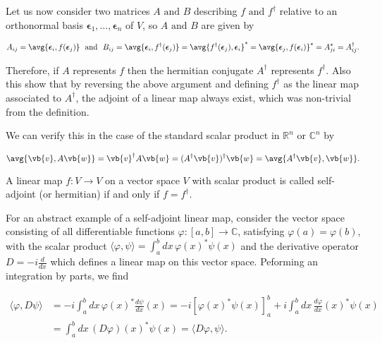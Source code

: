 \documentclass[a4paper,12pt]{report}
\begin{document}
Let us now consider two matrices \(A\text { and } B\) describing \(f \text { and } f^{\dagger} \) relative to an orthonormal basis \(\boldsymbol{\epsilon }_{1}, \ldots , \boldsymbol{\epsilon }_{n}   \) of \(V\), so \(A\text { and } B\) are given by 

\begin{equation}
    A_{ij}= \avg{\boldsymbol{\epsilon }_{i}, f(\boldsymbol{\epsilon }_{j}  )  } ~\text { and }~  B_{ij}=\avg{\boldsymbol{\epsilon }_{i}, f^{\dagger} (\boldsymbol{\epsilon }_{j}  )  }= \avg{f^{\dagger} (\boldsymbol{\epsilon }_{j}  ), \boldsymbol{\epsilon }_{i}  }^{*} = \avg{\boldsymbol{\epsilon }_{j}, f(\boldsymbol{\epsilon } _{i} )  }^{*} = A_{ji}^{*} = A^{\dagger} _{ij}.    
\end{equation}

Therefore, if \(A\) represents \(f\) then the hermitian conjugate \(A^{\dagger} \) represents \(f^{\dagger} \). Also this show that by reversing the above argument and defining \(f^{\dagger} \) as the linear map associated to \(A^{\dagger} \), the adjoint of a linear map always exist, which was non-trivial from the definition.

We can verify this in the case of the standard scalar product in \(\mathbb{R}^{n} \text { or } \mathbb{C}^{n}  \) by

\begin{equation}
    \avg{\vb{v} ,A\vb{w} } = \vb{v} ^{\dagger} A \vb{w}  = (A^{\dagger} \vb{v} )^{\dagger} \vb{w} = \avg{A^{\dagger} \vb{v} ,\vb{w} }.   
\end{equation}

\begin{definition}
A linear map \(f:V \rightarrow V\) on a vector space \(V\) with scalar product is called self-adjoint (or hermitian) if and only if \(f= f^{\dagger} \).


\end{definition}

For an abstract example of a self-adjoint linear map, consider the vector space consisting of all differentiable functions $\varphi : [a, b] \to \mathbb{C}$, satisfying $\varphi(a) = \varphi(b)$, with the scalar product \(\langle \varphi, \psi \rangle = \int_a^b dx \, \varphi(x)^* \psi(x)\) and the derivative operator \(D = -i \frac{d}{dx}\) which defines a linear map on this vector space. Peforming an integration by parts, we find

\begin{equation}
\begin{aligned}
\langle \varphi, D\psi \rangle &= -i \int_a^b dx \, \varphi(x)^* \frac{d\psi}{dx}(x) = -i \left[ \varphi(x)^* \psi(x) \right]_{a}^{b} + i \int_a^b dx \, \frac{d\varphi}{dx}(x)^* \psi(x) \\ &= \int_a^b dx \, (D\varphi)(x)^* \psi(x) = \langle D\varphi, \psi \rangle.
\end{aligned}
\end{equation}
\end{document}
